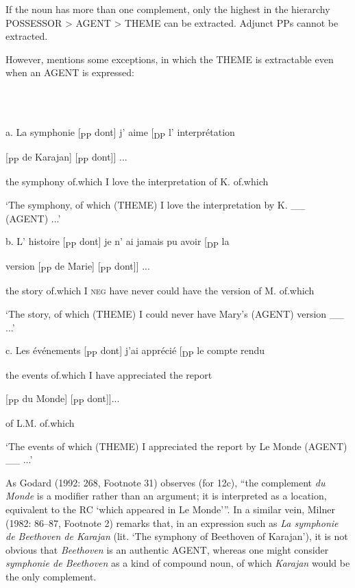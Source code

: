\documentclass[output=paper]{langsci/langscibook}
\begin{document}
If the noun has more than one complement, only the highest in the hierarchy   POSSESSOR > AGENT > THEME can be extracted. Adjunct PPs cannot be extracted.

However, \citet[160]{Pollock1989} mentions some exceptions, in which the THEME is extractable even when an AGENT is expressed:

\ea%
    \label{ex:key:12}
    \gll\\
        \\
    \glt
    \z

          a.   La symphonie  [\textsubscript{PP} dont]  j’  aime  [\textsubscript{DP} l’  interprétation     

[\textsubscript{PP} de Karajan]  [\textsubscript{PP} dont]] ...

    the symphony  of.which  I   love        the interpretation            of  K.      of.which

‘The symphony, of which (THEME) I love the interpretation by K. \_\_ (AGENT) ...’

  b.   L’  histoire [\textsubscript{PP}  dont]     je   n’  ai  jamais  pu  avoir [\textsubscript{DP} la

    version   [\textsubscript{PP}  de Marie] [\textsubscript{PP}  dont]] ...

    the  story     of.which     I   \textsc{neg}  have  never  could  have  the      version    of M.    of.which 

‘The story, of which (THEME) I could never have Mary’s (AGENT) version \_\_ ...’

c.   Les  événements [\textsubscript{PP}  dont]  j’ai  apprécié [\textsubscript{DP} le  compte rendu 

    the  events    of.which  I have  appreciated   the  report  

    [\textsubscript{PP}  du Monde] [\textsubscript{PP}  dont]]...

      of L.M.    of.which

‘The events of which (THEME) I appreciated the report by Le Monde (AGENT) \_\_ ...’

As Godard (1992: 268, Footnote 31) observes (for 12c), “the complement \textit{du Monde} is a modifier rather than an argument; it is interpreted as a location, equivalent to the RC ‘which appeared in Le Monde’”. In a similar vein, Milner (1982: 86–87, Footnote 2) remarks that, in an expression such as \textit{La symphonie de Beethoven de Karajan} (lit. ‘The symphony of Beethoven of Karajan’), it is not obvious that \textit{Beethoven} is an authentic AGENT, whereas one might consider \textit{symphonie de Beethoven} as a kind of compound noun, of which \textit{Karajan} would be the only complement.
\end{document}
